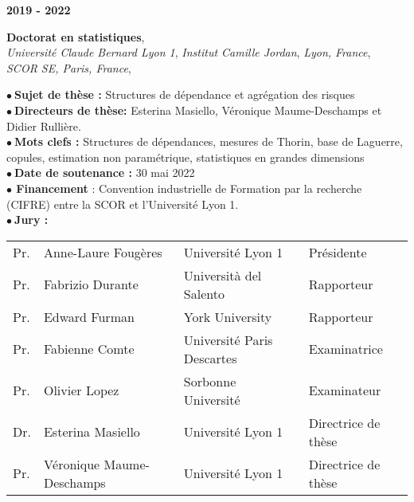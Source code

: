 \documentclass[a4paper,11pt]{article} %
\newcommand{\tabcv}[2]{
\begin{minipage}[t]{0.12\linewidth}
\textbf{\footnotesize #1}
\end{minipage}\hfill
\begin{minipage}[t]{0.85\linewidth}
#2
\end{minipage}
\vspace{1em}
}
\begin{document}
\begin{flushleft}
\tabcv{2019 - 2022}{
\textbf{Doctorat en statistiques}, \\ \textit{Université Claude Bernard Lyon 1}, \textit{Institut Camille Jordan}, \textit{Lyon, France}, \\ \textit{SCOR SE, Paris, France}, \textit{}\\[0.5em]
{\footnotesize \textbf{$\bullet\ $Sujet de thèse :} {Structures de dépendance et agrégation des risques}\\
\textbf{$\bullet\ $Directeurs de thèse:} Esterina Masiello, Véronique Maume-Deschamps et Didier Rullière.\\
\textbf{$\bullet\ $Mots clefs :} {Structures de dépendances, mesures de Thorin, base de Laguerre, copules, estimation non paramétrique, statistiques en grandes dimensions}\\
\textbf{$\bullet\ $Date de soutenance :} 30 mai 2022\\
\textbf{$\bullet$ Financement} : Convention industrielle de Formation par la recherche (CIFRE) entre la SCOR et l'Université Lyon 1.\\
\textbf{$\bullet\ $Jury :} \\[0.25em]
\begin{tabular}{llll}
{Pr.} & {Anne-Laure Fougères}       & {Université Lyon 1} & {Présidente} \\
{Pr.} & {Fabrizio Durante}          & {Università del Salento} & {Rapporteur} \\
{Pr.} & {Edward Furman}             & {York University} & {Rapporteur} \\
{Pr.} & {Fabienne Comte}            & {Université Paris Descartes} & {Examinatrice} \\
{Pr.} & {Olivier Lopez}             & {Sorbonne Université} & {Examinateur} \\
{Dr.} & {Esterina Masiello}         & {Université Lyon 1} & {Directrice de thèse} \\
{Pr.} & {Véronique Maume-Deschamps} & {Université Lyon 1} & {Directrice de thèse} \\
\end{tabular}}
}


\end{flushleft}
\end{document}

